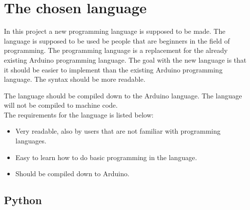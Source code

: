 \section{The chosen language}
In this project a new programming language is supposed to be made. The language is supposed to be used be people that are beginners in the field of programming. The programming language is a replacement for the already existing Arduino programming language. 
The goal with the new language is that it should be easier to implement than the existing Arduino programming language. The syntax should be more readable. 

The language should be compiled down to the Arduino language. The language will not be compiled to machine code. \\

The requirements for the language is listed below:
\begin{itemize}
	\item Very readable, also by users that are not familiar with programming languages.
	\item Easy to learn how to do basic programming in the language.
	\item Should be compiled down to Arduino.
\end{itemize}

\subsection{Python}
